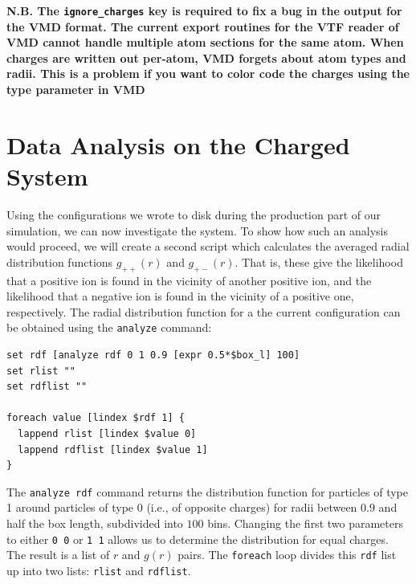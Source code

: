 \documentclass[
a4paper,                        %
11pt,                           %
twoside,                        %
footsepline,                    %
headsepline,                    %
headexclude,                    %
footexclude,                    %
pagesize,                       %
]{scrartcl}
\newtheorem{task}{Task}
\begin{document}
\textbf{N.B. The \texttt{ignore\_charges} key is required to fix a bug in the \es{} output for the VMD format. The current export routines for the VTF reader of VMD cannot handle multiple atom sections for the same atom. When charges are written out per-atom, VMD forgets about atom types and radii. This is a problem if you want to color code the charges using the type parameter in VMD}

\vspace{1cm}
\vspace{1cm}

\section{Data Analysis on the Charged System}

Using the configurations we wrote to disk during the production part of our simulation, we can now investigate the system. To show how such an analysis would proceed, we will create a second script which calculates the averaged radial distribution functions $g_{++}(r)$ and $g_{+-}(r)$. That is, these give the likelihood that a positive ion is found in the vicinity of another positive ion, and the likelihood that a negative ion is found in the vicinity of a positive one, respectively. The radial distribution function for a the current configuration can be obtained using the \verb|analyze| command:

{\small\vspace{0,2cm}
\begin{lstlisting}[numbers=none]
set rdf [analyze rdf 0 1 0.9 [expr 0.5*$box_l] 100]
set rlist ""
set rdflist ""

foreach value [lindex $rdf 1] {
  lappend rlist [lindex $value 0]
  lappend rdflist [lindex $value 1]
}
\end{lstlisting}\vspace{0,2cm}
}

\noindent The \verb|analyze rdf| command returns the distribution function for particles of type 1 around particles of type 0 (i.e., of opposite charges) for radii between $0.9$ and half the box length, subdivided into $100$ bins. Changing the first two parameters to either \texttt{0 0} or \texttt{1 1} allows us to determine the distribution for equal charges. The result is a list of $r$ and $g(r)$ pairs. The \verb|foreach| loop divides this \texttt{rdf} list up into two lists: \verb|rlist| and \verb|rdflist|.
\end{document}
